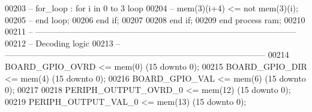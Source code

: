 \begin{DoxyCode}
00203 \textcolor{keyword}{--                  for\_loop : for i in 0 to 3 loop                 }
00204 \textcolor{keyword}{--                      mem(3)(i+4) <= not mem(3)(i);}
00205 \textcolor{keyword}{--                  end loop;}
00206                 \textcolor{keywordflow}{end} \textcolor{keywordflow}{if};
00207                 
00208         \textcolor{keywordflow}{end} \textcolor{keywordflow}{if};
00209     \textcolor{keywordflow}{end} \textcolor{keywordflow}{process} \textcolor{vhdlchar}{ram};
00210     
00211 \textcolor{keyword}{    -- ---------------------------------------------------------------------------------------------}
00212 \textcolor{keyword}{    -- Decoding logic}
00213 \textcolor{keyword}{    -- ---------------------------------------------------------------------------------------------}
00214         \textcolor{vhdlchar}{BOARD_GPIO_OVRD}     \textcolor{vhdlchar}{<=} \textcolor{vhdlchar}{mem}\textcolor{vhdlchar}{(}\textcolor{vhdllogic}{}\textcolor{vhdllogic}{0}\textcolor{vhdlchar}{)} \textcolor{vhdlchar}{(}\textcolor{vhdllogic}{}\textcolor{vhdllogic}{15} \textcolor{keywordflow}{downto} \textcolor{vhdllogic}{}\textcolor{vhdllogic}{0}\textcolor{vhdlchar}{)};
00215         \textcolor{vhdlchar}{BOARD_GPIO_DIR}          \textcolor{vhdlchar}{<=} \textcolor{vhdlchar}{mem}\textcolor{vhdlchar}{(}\textcolor{vhdllogic}{}\textcolor{vhdllogic}{4}\textcolor{vhdlchar}{)} \textcolor{vhdlchar}{(}\textcolor{vhdllogic}{}\textcolor{vhdllogic}{15} \textcolor{keywordflow}{downto} \textcolor{vhdllogic}{}\textcolor{vhdllogic}{0}\textcolor{vhdlchar}{)};
00216         \textcolor{vhdlchar}{BOARD_GPIO_VAL}          \textcolor{vhdlchar}{<=} \textcolor{vhdlchar}{mem}\textcolor{vhdlchar}{(}\textcolor{vhdllogic}{}\textcolor{vhdllogic}{6}\textcolor{vhdlchar}{)} \textcolor{vhdlchar}{(}\textcolor{vhdllogic}{}\textcolor{vhdllogic}{15} \textcolor{keywordflow}{downto} \textcolor{vhdllogic}{}\textcolor{vhdllogic}{0}\textcolor{vhdlchar}{)};
00217         
00218         \textcolor{vhdlchar}{PERIPH_OUTPUT_OVRD_0}    \textcolor{vhdlchar}{<=} \textcolor{vhdlchar}{mem}\textcolor{vhdlchar}{(}\textcolor{vhdllogic}{}\textcolor{vhdllogic}{12}\textcolor{vhdlchar}{)} \textcolor{vhdlchar}{(}\textcolor{vhdllogic}{}\textcolor{vhdllogic}{15} \textcolor{keywordflow}{downto} \textcolor{vhdllogic}{}\textcolor{vhdllogic}{0}\textcolor{vhdlchar}{)};
00219       \textcolor{vhdlchar}{PERIPH_OUTPUT_VAL_0}   \textcolor{vhdlchar}{<=} \textcolor{vhdlchar}{mem}\textcolor{vhdlchar}{(}\textcolor{vhdllogic}{}\textcolor{vhdllogic}{13}\textcolor{vhdlchar}{)} \textcolor{vhdlchar}{(}\textcolor{vhdllogic}{}\textcolor{vhdllogic}{15} \textcolor{keywordflow}{downto} \textcolor{vhdllogic}{}\textcolor{vhdllogic}{0}\textcolor{vhdlchar}{)};

\end{DoxyCode}
